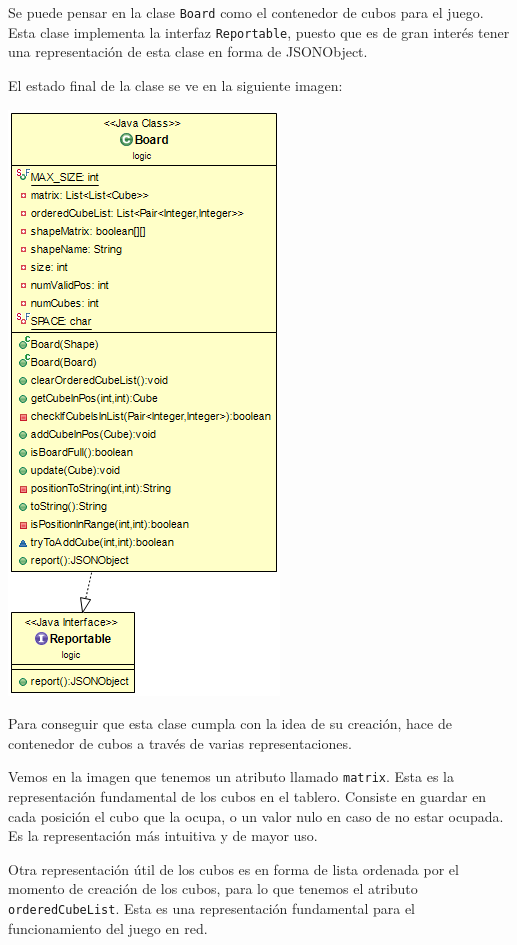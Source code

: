 \documentclass[../DocumentoOficial.tex]{subfiles}
\begin{document}
Se puede pensar en la clase \texttt{Board} como el contenedor de cubos para el juego. Esta clase implementa la interfaz \texttt{Reportable}, puesto que es de gran interés tener una representación de esta clase en forma de JSONObject.

El estado final de la clase se ve en la siguiente imagen:

\begin{center}
\includegraphics[scale=0.75]{Board-final.png} 
\end{center}

Para conseguir que esta clase cumpla con la idea de su creación, hace de contenedor de cubos a través de varias representaciones.

Vemos en la imagen que tenemos un atributo llamado \texttt{matrix}. Esta es la representación fundamental de los cubos en el tablero. Consiste en guardar en cada posición el cubo que la ocupa, o un valor nulo en caso de no estar ocupada. Es la representación más intuitiva y de mayor uso.

Otra representación útil de los cubos es en forma de lista ordenada por el momento de creación de los cubos, para lo que tenemos el atributo \texttt{orderedCubeList}. Esta es una representación fundamental para el funcionamiento del juego en red.
\end{document}

